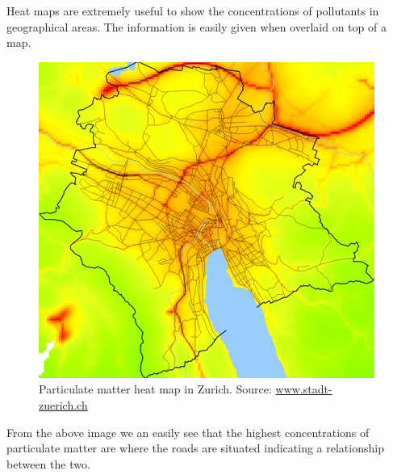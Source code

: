 Heat maps are extremely useful to show the concentrations of pollutants in geographical areas. The information is easily given when overlaid on top of a map.  

\begin{figure}[H]
        \begin{center}
                \includegraphics[scale=0.5]{./images/heatmaps/zurichpm.jpg}
                \caption{Particulate matter heat map in Zurich. Source: \url{www.stadt-zuerich.ch}}
                \label{fig:pmheatmapzurich}
        \end{center}
\end{figure}

From the above image we an easily see that the highest concentrations of particulate matter are where the roads are situated indicating a relationship between the two. 




